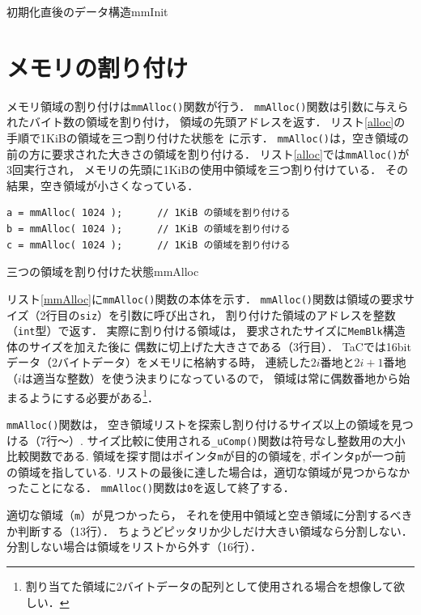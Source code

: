 {初期化直後のデータ構造}{mmInit}

\section{メモリの割り付け}
メモリ領域の割り付けは{\tt mmAlloc()}関数が行う．
{\tt mmAlloc()}関数は引数に与えられたバイト数の領域を割り付け，
領域の先頭アドレスを返す．
リスト\ref{alloc}の手順で1KiBの領域を三つ割り付けた状態を
に示す．
{\tt mmAlloc()}は，空き領域の前の方に要求された大きさの領域を割り付ける．
リスト\ref{alloc}では{\tt mmAlloc()}が3回実行され，
メモリの先頭に1KiBの使用中領域を三つ割り付けている．
その結果，空き領域が小さくなっている．

\begin{lstlisting}[label=alloc, caption=データ構造と初期化]
a = mmAlloc( 1024 );      // 1KiB の領域を割り付ける
b = mmAlloc( 1024 );      // 1KiB の領域を割り付ける
c = mmAlloc( 1024 );      // 1KiB の領域を割り付ける
\end{lstlisting}

{三つの領域を割り付けた状態}{mmAlloc}

リスト\ref{mmAlloc}に{\tt mmAlloc()}関数の本体を示す．
{\tt mmAlloc()}関数は領域の要求サイズ（2行目の{\tt siz}）を引数に呼び出され，
割り付けた領域のアドレスを整数（{\tt int}型）で返す．
実際に割り付ける領域は，
要求されたサイズに{\tt MemBlk}構造体のサイズを加えた後に
偶数に切上げた大きさである（3行目）．
TaCでは16bitデータ（2バイトデータ）をメモリに格納する時，
連続した$2i$番地と$2i+1$番地（$i$は適当な整数）を使う決まりになっているので，
領域は常に偶数番地から始まるようにする必要がある\footnote{
割り当てた領域に2バイトデータの配列として使用される場合を想像して欲しい．}．

{\tt mmAlloc()}関数は，
空き領域リストを探索し割り付けるサイズ以上の領域を見つける（7行〜）.
サイズ比較に使用される{\tt \_uComp()}関数は符号なし整数用の大小比較関数である.
領域を探す間はポインタ{\tt m}が目的の領域を,
ポインタ{\tt p}が一つ前の領域を指している.
リストの最後に達した場合は，適切な領域が見つからなかったことになる．
{\tt mmAlloc()}関数は{\tt 0}を返して終了する．

適切な領域（{\tt m}）が見つかったら，
それを使用中領域と空き領域に分割するべきか判断する（13行）．
ちょうどピッタリか少しだけ大きい領域なら分割しない．
分割しない場合は領域をリストから外す（16行）．


